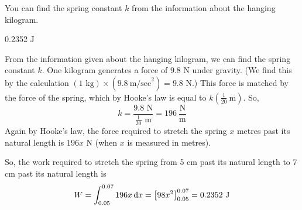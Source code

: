 \begin{hint}
You can find the spring constant $k$ from the information about the hanging kilogram.
\end{hint}
\begin{answer}
0.2352 J
\end{answer}
\begin{solution}
From the information given about the hanging kilogram, we can find the spring constant $k$. One kilogram generates a force of $9.8$ N under  gravity. (We find this by the calculation $(1\text{ kg})\times(9.8~\text{m/sec}^2)=9.8\text{ N}$.) This force is matched by the force of the spring, which by Hooke's law is equal to $k(\frac{1}{20}~\text{m})$. So,
\[k = \frac{9.8 \text{ N}}{\frac{1}{20} \text{ m} } = 196 ~\frac{\text{N}}{\text{m}}\]
Again by Hooke's law, the force required to stretch the spring $x$ metres past its natural length is $196x$ N (when $x$ is measured in metres).

So, the work required to stretch the spring from 5 cm past its natural length to 7 cm past its natural length is
\[W = \int_{0.05}^{0.07} 196 x\,\mathrm{d}x = \big[98x^2\big]_{0.05}^{0.07}=0.2352\text{ J}\]
\end{solution}



